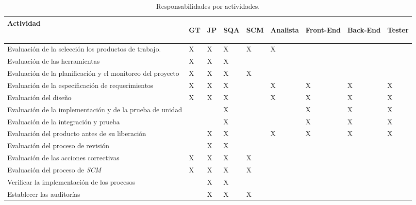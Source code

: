 \begin{table}[H]
    \caption[Responsabilidades por actividades.] {Responsabilidades por actividades.}
    \label{tbl:responsabilidades por actividades}
    \begin{tabular}{|p{}|p{}|p{}|p{}|p{}|p{}|p{}|p{}|p{}|}
        \hline
        \textbf{Actividad} &  \begin{sideways}\textbf{GT}\end{sideways} & \begin{sideways}\textbf{JP}\end{sideways} & \begin{sideways}\textbf{SQA}\end{sideways} & \begin{sideways}\textbf{SCM}\end{sideways} & \begin{sideways}\textbf{Analista}\end{sideways} & \begin{sideways}\textbf{Front-End}\end{sideways} & \begin{sideways}\textbf{Back-End}\end{sideways} & \begin{sideways}\textbf{Tester}\end{sideways}\\
    	\hline
    	\hline
    	Evaluación	de la selección los productos de trabajo. & X & X & X & X & X & & & \\ \hline
    	Evaluación de las herramientas & X & X & X & & & & & \\ \hline
    	Evaluación de la planificación y el monitoreo del proyecto & X & X & X & X & & & & \\ \hline
    	Evaluación de la especificación de requerimientos & X & X & X & & X & X & X & X \\ \hline
    	Evaluación del diseño & X & X & X & & X & X & X & X \\ \hline
    	Evaluación de la implementación y de la prueba de unidad & & & X & & & X & X & X \\ \hline
    	Evaluación de la integración y prueba & & & X & & & X & X & X \\ \hline
    	Evaluación del producto antes de su liberación & & X & X & & X & X & X & X \\ \hline
    	Evaluación del proceso de revisión & & X & X & & & & & \\ \hline
    	Evaluación de las acciones correctivas & X & X & X & X & & & & \\ \hline
    	Evaluación del proceso de \textit{SCM} & X & X & X & X & & & & \\ \hline
    	Verificar la implementación de los procesos & & X & X & & & & & \\ \hline
    	Establecer las auditorías & & X & X & X & & & & \\ \hline
    	
    \end{tabular}
\end{table}















	



